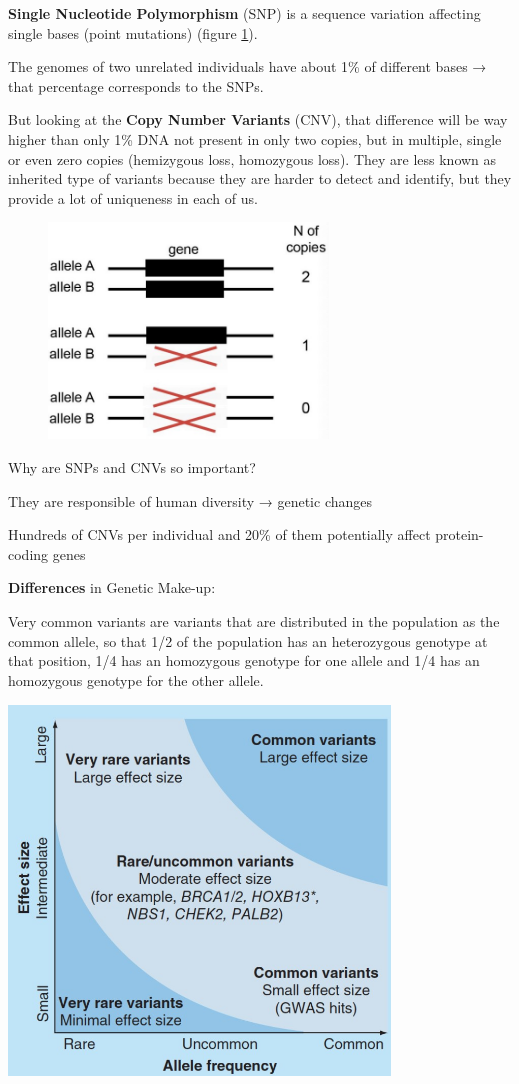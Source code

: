 \textbf{Single Nucleotide Polymorphism} (SNP) is a sequence variation affecting
single bases (point mutations) (figure \ref{fig: SNP}).

The genomes of two unrelated individuals have about 1\% of different bases →
that percentage corresponds to the SNPs.

But looking at the \textbf{Copy Number Variants} (CNV), that difference will be
way higher than only 1\% DNA not present in only two copies, but in multiple,
single or even zero copies (hemizygous loss, homozygous loss). They are less
known as inherited type of variants because they are harder to detect and
identify, but they provide a lot of uniqueness in each of us.


\begin{figure}[H]
  \includegraphics[width=2.93475in,height=2.26167in]{image3.jpeg} 
  \centering
  \caption{}
  \label{fig: SNP}
\end{figure}


Why are SNPs and CNVs so important?

They are responsible of human diversity → genetic changes

Hundreds of CNVs per individual and 20\% of them potentially affect protein-
coding genes

\textbf{Differences} in Genetic Make-up:

Very common variants are variants that are distributed in the population as the
common allele, so that 1/2 of the population has an heterozygous genotype at
that position, 1/4 has an homozygous genotype for one allele and 1/4 has an
homozygous genotype for the other allele.

\includegraphics[width=3.9928in,height=3.87812in]{image4.jpeg}

